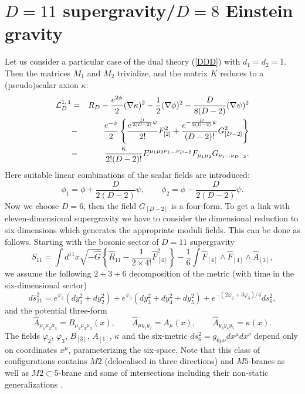 \documentclass[a4paper,12pt]{article}
\begin{document}
\section{$D=11$ supergravity/$D=8$ Einstein gravity}
Let us consider a particular case of the dual theory (\ref{DDD})
with $d_1=d_2=1$. Then the matrices $M_1$ and $M_2$ trivialize,
and the matrix $K$ reduces to a (pseudo)scalar axion $\kappa$:
\begin{eqnarray}\label{D11}
{\cal L}_{D}^{1,\,1} &=& R_{D} - \frac{e^{2\phi}}2
(\nabla\kappa)^2 - \frac12 (\nabla\phi)^2 -
\frac{D}{8(D-2)}(\nabla\psi)^2 \nonumber\\
&-& \frac{e^{-\phi}}2 \left\{
\frac{e^{\frac{D}{2(D-2)}\psi}}{2!}F_{[2]}^2 +
\frac{e^{-\frac{D}{2(D-2)}\psi}}{(D-2)!} G_{[D-2]}^2 \right\}
\nonumber\\
&-& \frac{\kappa}{2!(D-2)!} E^{\mu_1\mu_2\nu_1...\nu_{D-2}}
F_{\mu_1\mu_2} G_{\nu_1...\nu_{D-2}}.
\end{eqnarray}
Here suitable linear combinations of the scalar fields are
introduced:
\begin{equation}\label{p1}
\phi_1 = \phi + \frac{D}{2(D-2)}\psi, \qquad \phi_2 = \phi -
\frac{D}{2(D-2)}\psi.
\end{equation}
Now we choose $D=6$, then the field $G_{[D-2]}$ is a four-form.
To get a link with eleven-dimensional supergravity we have to
consider the dimensional reduction to six dimensions which
generates the appropriate moduli fields. This can be done as
follows. Starting with the bosonic sector of $D=11$ supergravity
\begin{equation}\label{11d}
S_{11} = \int d^{11} x \sqrt{-\hat G} \left\{ \hat R_{11} -
\frac1{2\times 4!} \hat F_{[4]}^2 \right\} - \frac16 \int \hat
F_{[4]} \wedge \hat F_{[4]} \wedge \hat A_{[3]},
\end{equation}
we assume the following $2+3+6$ decomposition of the metric
(with time in the six-dimensional sector)
\begin{equation}\label{ANZ}
d \hat s_{11}^2 = e^{\varphi_2}(dy_1^2+dy_2^2) + e^{\varphi_3}
(dy_3^2+dy_4^2+dy_5^2) + e^{-(2\varphi_2+3\varphi_3)/4} ds^2_{6},
\end{equation}
and  the potential three-form
\begin{equation}
\hat A_{\mu_1\mu_2\mu_3} = B_{\mu_1\mu_2\mu_3}(x), \qquad \hat
A_{\mu y_1 y_2} = A_{\mu}(x), \qquad \hat A_{y_3y_4y_5} =
\kappa(x).
\end{equation}
The fields $\varphi_2$, $\varphi_3$, $B_{[3]}$, $A_{[1]}$,
$\kappa$ and the six-metric $ds^2_{6}=g_{6\mu\nu}dx^\mu dx^\nu$
depend only on coordinates $x^{\mu}$, parameterizing the
six-space. Note that this class of configurations contains $M2$
(delocalised in three directions) and $M5$-branes as well as
$M2\subset 5$-brane \cite{Lam96,Pa96} and some of intersections
\cite{Co96a,Co96b,Co97} including their non-static
generalizations \cite{ChGaSh00}.
\end{document}
